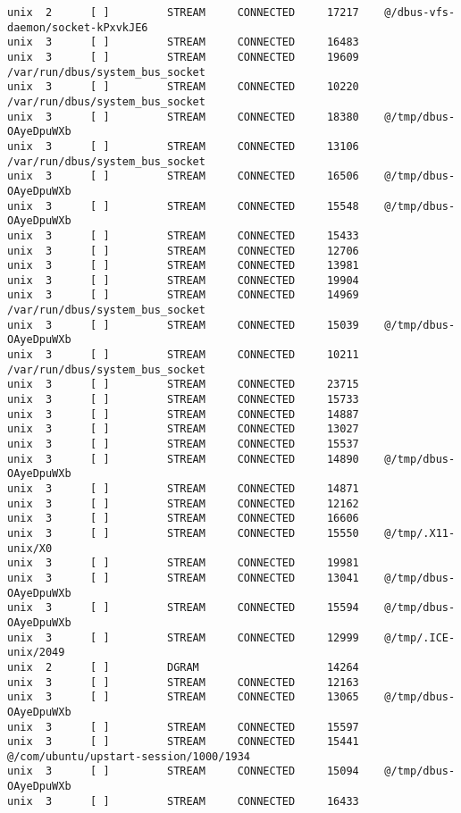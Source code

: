 \begin{lstlisting}
unix  2      [ ]         STREAM     CONNECTED     17217    @/dbus-vfs-daemon/socket-kPxvkJE6
unix  3      [ ]         STREAM     CONNECTED     16483    
unix  3      [ ]         STREAM     CONNECTED     19609    /var/run/dbus/system_bus_socket
unix  3      [ ]         STREAM     CONNECTED     10220    /var/run/dbus/system_bus_socket
unix  3      [ ]         STREAM     CONNECTED     18380    @/tmp/dbus-OAyeDpuWXb
unix  3      [ ]         STREAM     CONNECTED     13106    /var/run/dbus/system_bus_socket
unix  3      [ ]         STREAM     CONNECTED     16506    @/tmp/dbus-OAyeDpuWXb
unix  3      [ ]         STREAM     CONNECTED     15548    @/tmp/dbus-OAyeDpuWXb
unix  3      [ ]         STREAM     CONNECTED     15433    
unix  3      [ ]         STREAM     CONNECTED     12706    
unix  3      [ ]         STREAM     CONNECTED     13981    
unix  3      [ ]         STREAM     CONNECTED     19904    
unix  3      [ ]         STREAM     CONNECTED     14969    /var/run/dbus/system_bus_socket
unix  3      [ ]         STREAM     CONNECTED     15039    @/tmp/dbus-OAyeDpuWXb
unix  3      [ ]         STREAM     CONNECTED     10211    /var/run/dbus/system_bus_socket
unix  3      [ ]         STREAM     CONNECTED     23715    
unix  3      [ ]         STREAM     CONNECTED     15733    
unix  3      [ ]         STREAM     CONNECTED     14887    
unix  3      [ ]         STREAM     CONNECTED     13027    
unix  3      [ ]         STREAM     CONNECTED     15537    
unix  3      [ ]         STREAM     CONNECTED     14890    @/tmp/dbus-OAyeDpuWXb
unix  3      [ ]         STREAM     CONNECTED     14871    
unix  3      [ ]         STREAM     CONNECTED     12162    
unix  3      [ ]         STREAM     CONNECTED     16606    
unix  3      [ ]         STREAM     CONNECTED     15550    @/tmp/.X11-unix/X0
unix  3      [ ]         STREAM     CONNECTED     19981    
unix  3      [ ]         STREAM     CONNECTED     13041    @/tmp/dbus-OAyeDpuWXb
unix  3      [ ]         STREAM     CONNECTED     15594    @/tmp/dbus-OAyeDpuWXb
unix  3      [ ]         STREAM     CONNECTED     12999    @/tmp/.ICE-unix/2049
unix  2      [ ]         DGRAM                    14264    
unix  3      [ ]         STREAM     CONNECTED     12163    
unix  3      [ ]         STREAM     CONNECTED     13065    @/tmp/dbus-OAyeDpuWXb
unix  3      [ ]         STREAM     CONNECTED     15597    
unix  3      [ ]         STREAM     CONNECTED     15441    @/com/ubuntu/upstart-session/1000/1934
unix  3      [ ]         STREAM     CONNECTED     15094    @/tmp/dbus-OAyeDpuWXb
unix  3      [ ]         STREAM     CONNECTED     16433    

\end{lstlisting}
